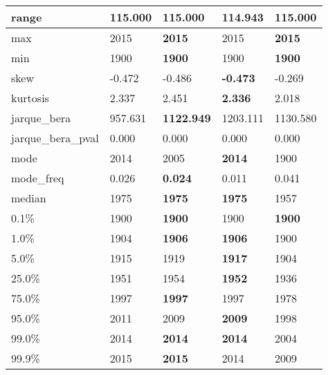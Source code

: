 \begin{table}[H]
\begin{tabular}{|l|m{10em}|m{10em}|m{10em}|m{10em}|}
\hline range & 115.000 & \bfseries 115.000 & \cellcolor[rgb]{0.9, 0.54, 0.52} 114.943 & \bfseries 115.000 \\
\hline max & 2015 & \bfseries 2015 & \cellcolor[rgb]{0.9, 0.54, 0.52} 2015 & \bfseries 2015 \\
\hline min & 1900 & \bfseries 1900 & \cellcolor[rgb]{0.9, 0.54, 0.52} 1900 & \bfseries 1900 \\
\hline skew & -0.472 & -0.486 & \bfseries -0.473 & \cellcolor[rgb]{0.9, 0.54, 0.52} -0.269 \\
\hline kurtosis & 2.337 & 2.451 & \bfseries 2.336 & \cellcolor[rgb]{0.9, 0.54, 0.52} 2.018 \\
\hline jarque\_bera & 957.631 & \bfseries 1122.949 & \cellcolor[rgb]{0.9, 0.54, 0.52} 1203.111 & 1130.580 \\
\hline jarque\_bera\_pval & 0.000 & 0.000 & 0.000 & 0.000 \\
\hline mode & 2014 & 2005 & \bfseries 2014 & \cellcolor[rgb]{0.9, 0.54, 0.52} 1900 \\
\hline mode\_freq & 0.026 & \bfseries 0.024 & 0.011 & \cellcolor[rgb]{0.9, 0.54, 0.52} 0.041 \\
\hline median & 1975 & \bfseries 1975 & \bfseries 1975 & \cellcolor[rgb]{0.9, 0.54, 0.52} 1957 \\
\hline 0.1\% & 1900 & \bfseries 1900 & \cellcolor[rgb]{0.9, 0.54, 0.52} 1900 & \bfseries 1900 \\
\hline 1.0\% & 1904 & \bfseries 1906 & \bfseries 1906 & \cellcolor[rgb]{0.9, 0.54, 0.52} 1900 \\
\hline 5.0\% & 1915 & 1919 & \bfseries 1917 & \cellcolor[rgb]{0.9, 0.54, 0.52} 1904 \\
\hline 25.0\% & 1951 & 1954 & \bfseries 1952 & \cellcolor[rgb]{0.9, 0.54, 0.52} 1936 \\
\hline 75.0\% & 1997 & \bfseries 1997 & 1997 & \cellcolor[rgb]{0.9, 0.54, 0.52} 1978 \\
\hline 95.0\% & 2011 & 2009 & \bfseries 2009 & \cellcolor[rgb]{0.9, 0.54, 0.52} 1998 \\
\hline 99.0\% & 2014 & \bfseries 2014 & \bfseries 2014 & \cellcolor[rgb]{0.9, 0.54, 0.52} 2004 \\
\hline 99.9\% & 2015 & \bfseries 2015 & 2014 & \cellcolor[rgb]{0.9, 0.54, 0.52} 2009 \\
\hline
\end{tabular}
\end{table}
